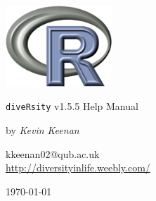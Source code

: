 \begin{titlepage}
\begin{center}
\includegraphics[width=40mm]{Rlogo_3.png}
\end{center}
\begin{center}
\LARGE
\texttt{diveRsity} v1.5.5 Help Manual
\end{center}
\begin{center}
\Large
by \emph{Kevin Keenan}
\end{center}
\begin{center}
\normalsize
kkeenan02@qub.ac.uk\\
\vspace{0.5cm}
\url{http://diversityinlife.weebly.com/}
\end{center}
\begin{center}
\small
\today
\end{center}
\end{titlepage}